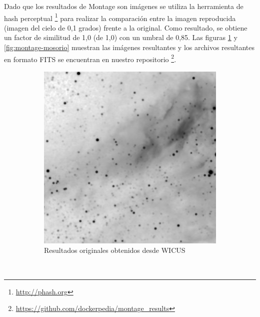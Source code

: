Dado que los resultados de Montage son imágenes se utiliza la herramienta de hash perceptual \footnote{\url{http://phash.org}} para realizar la comparación entre la imagen reproducida (imagen del cielo de 0,1 grados) frente a la original.
Como resultado, se obtiene un factor de similitud de 1,0 (de 1,0) con un umbral de 0,85.
Las figuras \ref{fig:montage-wicus} y \ref{fig:montage-mosorio} muestran las imágenes resultantes y los archivos resultantes en formato FITS se encuentran en nuestro repositorio \footnote{\url{https://github.com/dockerpedia/montage_results}}. 

\begin{figure}[h]
    \centering
    \begin{subfigure}[b]{0.4\textwidth}
         \centering
         \includegraphics[width=\textwidth]{Figures/montage-original}
         \caption{Resultados originales obtenidos desde WICUS}
         \label{fig:montage-wicus}
     \end{subfigure}
         ~ 
	    \begin{subfigure}[b]{0.4\textwidth}
         \centering

\end{subfigure}
\end{figure}
